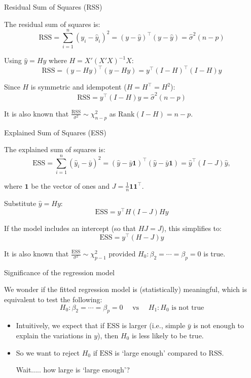 \documentclass[ignorenonframetext,]{beamer}
\begin{document}
\begin{frame}{Residual Sum of Squares (RSS)}

The residual sum of squares is:
\[
\mathrm{RSS} = \sum_{i=1}^n (y_i - \hat{y}_i)^2 = (y - \hat{y})^\top (y - \hat{y}) = \hat{\sigma}^2 (n-p)
\]

Using $\hat{y} = H y$ where $H = X'(X'X)^{-1}X$:
\[
\mathrm{RSS} = (y - Hy)^\top (y - Hy)
= y^\top (I - H)^\top (I - H) y
\]

Since $H$ is symmetric and idempotent ($H = H^\top = H^2$):
\[
\boxed{
\mathrm{RSS} = y^\top (I - H)  y = \hat{\sigma}^2 (n-p)
}
\]

It is also known that $\frac{\mathrm{RSS}}{\sigma^2} \sim \chi^2_{n-p}
$ as $\mathrm{Rank}(I-H)=n-p$.

\end{frame}


\begin{frame}{Explained  Sum of Squares (ESS)}

The explained sum of squares is:
\[
\mathrm{ESS} = \sum_{i=1}^n (\hat{y}_i - \bar{y})^2 = (\hat{y} - \bar{y}\mathbf{1})^\top (\hat{y} - \bar{y}\mathbf{1})
= \hat{y}^\top (I - J)\hat{y},
\]

where $\mathbf{1}$ be the vector of ones and $J = \frac{1}{n}\mathbf{1}\mathbf{1}^\top$.


Substitute $\hat{y} = Hy$:
\[
\mathrm{ESS} = y^\top H (I - J) H y
\]

If the model includes an intercept (so that $HJ = J$), this simplifies to:
\[
\boxed{
\mathrm{ESS} = y^\top (H - J) y
}
\]

It is also known that $\frac{\mathrm{ESS}}{\sigma^2} \sim \chi^2_{p-1}
$ {\color{red}provided $H_0: \beta_2=\cdots=\beta_p=0$ is true}.


\end{frame}


\begin{frame}{Significance of the regression model}

We wonder if the fitted regression model is (statistically) meaningful, which is equivalent to test the following:
$$
H_0: \beta_2=\cdots=\beta_p=0 \quad \text{ vs } \quad  H_1: H_0 \text{ is not true}
$$
\begin{itemize}
    \item Intuitively, we expect that if $\mathrm{ESS}$ is larger (i.e., simple $\bar{y}$ is not enough to explain the variations in $y$), then $H_0$ is less likely to be true. 
    \item So we want to reject $H_0$ if $\mathrm{ESS}$ is `large enough' compared to $\mathrm{RSS}$.

Wait..... how large is `large enough'?

\end{itemize}

\end{frame}
\end{document}
